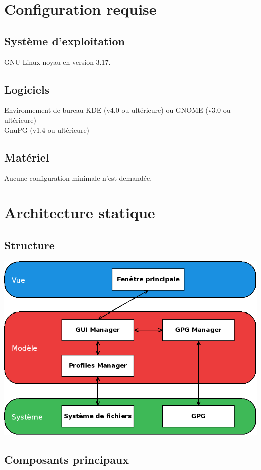 \documentclass{../res/univ-projet}
\begin{document}
\section{Configuration requise}
  \subsection{Système d'exploitation}
    GNU Linux noyau en version 3.17.
  \subsection{Logiciels}
    Environnement de bureau KDE (v4.0 ou ultérieure) ou GNOME (v3.0 ou ultérieure)\\
    GnuPG (v1.4 ou ultérieure)
  \subsection{Matériel}
    Aucune configuration minimale n'est demandée.

\section{Architecture statique}
  \subsection{Structure} %
    \includegraphics[scale=0.5]{graphics/diagramme_archi.png}
  \newpage

  \subsection{Composants principaux}
    
\end{document}
